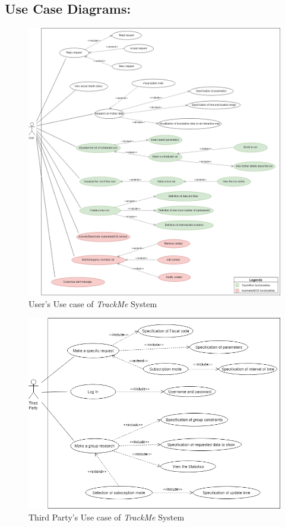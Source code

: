 \subsection{Use Case Diagrams:}
\begin{figure}[H]
    \centering
    \includegraphics[scale=0.4]{rasdL/Pictures/trackMeUseCaseUser.png}
    
    \caption{User's Use case of \emph{TrackMe} System}
\end{figure}

\newline
\begin{figure}[H]
    \centering
    \includegraphics[scale=0.4]{rasdL/Pictures/trackMeUseCaseThirdParty.png}
    \caption{Third Party's Use case of \emph{TrackMe} System}
\end{figure}